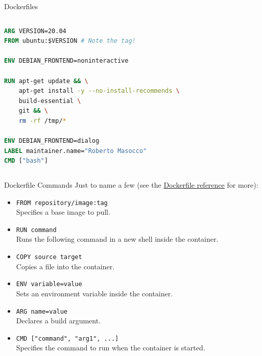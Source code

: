 \begin{frame}[fragile]{Dockerfiles}
\begin{columns}
\begin{lstlisting}[language=Dockerfile, caption=Minimal example of a Dockerfile running an Ubuntu image in a container]
ARG VERSION=20.04
FROM ubuntu:$VERSION # Note the tag!

ENV DEBIAN_FRONTEND=noninteractive

RUN apt-get update && \
    apt-get install -y --no-install-recommends \
    build-essential \
    git && \
    rm -rf /tmp/*

ENV DEBIAN_FRONTEND=dialog
LABEL maintainer.name="Roberto Masocco"
CMD ["bash"]
\end{lstlisting}
\end{columns}
\end{frame}
\begin{frame}{Dockerfile Commands}
Just to name a few (see the \href{https://docs.docker.com/engine/reference/builder/}{\color{blue}\underline{Dockerfile reference}} for more):
\begin{itemize}
  \item \texttt{FROM repository/image:tag}\\Specifies a base image to pull.
  \item \texttt{RUN command}\\Runs the following command in a new shell inside the container.
  \item \texttt{COPY source target}\\Copies a file into the container.
  \item \texttt{ENV variable=value}\\Sets an environment variable inside the container.
  \item \texttt{ARG name=value}\\Declares a build argument.
  \item \texttt{CMD ["command", "arg1", ...]}\\Specifies the command to run when the container is started.
\end{itemize}
\end{frame}

